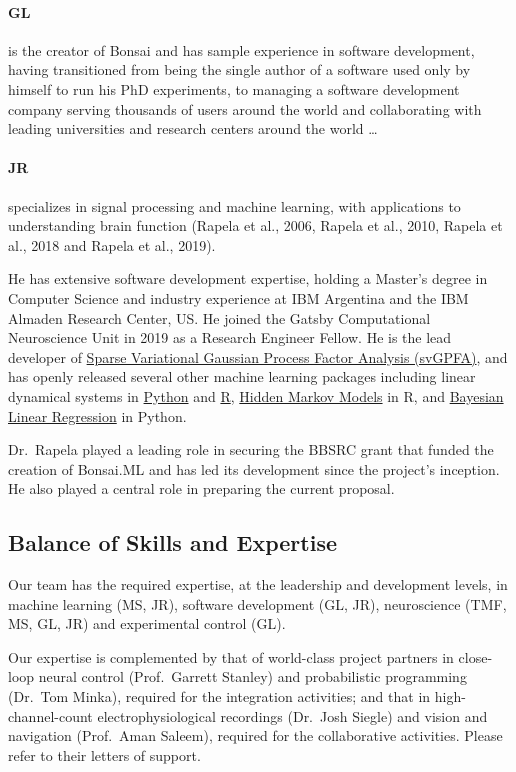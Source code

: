 \paragraph{GL} is the creator of Bonsai and
has sample experience in software development, having transitioned from being
the single author of a software used only by himself to run his PhD
experiments, to managing a software development company serving thousands of
users around the world and collaborating with leading universities and research
centers around the world \ldots

\paragraph{JR} specializes in
signal processing and machine learning, with applications to understanding
brain function (Rapela et al., 2006, Rapela et al., 2010, Rapela et al., 2018
and Rapela et al., 2019).

He has extensive software development expertise, holding a Master’s degree in
Computer Science and industry experience at IBM Argentina and the IBM Almaden
Research Center, US.
%
He joined the Gatsby Computational Neuroscience Unit in 2019 as a Research
Engineer Fellow.
%
He is the lead developer of \href{https://github.com/joacorapela/svGPFA}{Sparse
Variational Gaussian Process Factor Analysis (svGPFA)}, and has openly released
several other machine learning packages including linear dynamical systems in
\href{https://github.com/joacorapela/ssm}{Python} and
\href{https://github.com/joacorapela/kalmanFilter}{R},
\href{https://github.com/joacorapela/hiddenMarkovModels}{Hidden Markov Models}
in R, and
\href{https://github.com/joacorapela/bayesianLinearRegression}{Bayesian Linear
Regression} in Python.

Dr.~Rapela played a leading role in securing the BBSRC grant that funded the
creation of Bonsai.ML and has led its development since the project’s
inception. He also played a central role in preparing the current proposal.

\subsection*{Balance of Skills and Expertise}

Our team has the required expertise, at the leadership and development levels,
in machine learning (MS, JR), software development (GL, JR), neuroscience
(TMF, MS, GL, JR) and experimental control (GL).

Our expertise is complemented by that of world-class project partners in
close-loop neural control (Prof.~Garrett Stanley) and probabilistic programming
(Dr.~Tom Minka), required for the integration activities; and that in
high-channel-count electrophysiological recordings (Dr.~Josh Siegle) and vision
and navigation (Prof.~Aman Saleem), required for the collaborative activities.
Please refer to their letters of support.

